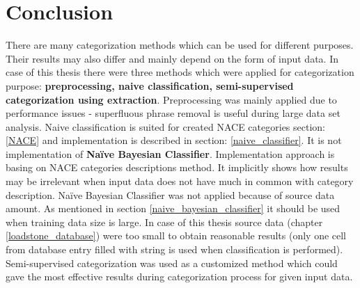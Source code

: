 \section{Conclusion}
There are many categorization methods which can be used for different purposes. Their results may also differ and mainly depend on the form of input data. In case of this thesis there were three methods which were applied for categorization purpose: \textbf{preprocessing, naive classification, semi-supervised categorization using extraction}. Preprocessing was mainly applied due to performance issues - superfluous phrase removal is useful during large data set analysis. Naive classification is suited for created NACE categories section: \ref{NACE} and implementation is described in section: \ref{naive_classifier}. It is not implementation of \textbf{Naïve Bayesian Classifier}. Implementation approach is basing on NACE categories descriptions method. It implicitly shows how results may be irrelevant when input data does not have much in common with category description. Naïve Bayesian Classifier was not applied because of source data amount. As mentioned in section \ref{naive_bayesian_classifier} it should be used when training data size is large. In case of this thesis source data (chapter \ref{loadstone_database}) were too small to obtain reasonable results (only one cell from database entry filled with string is used when classification is performed). Semi-supervised categorization was used as a customized method which could gave the most effective results during categorization process for given input data.    


